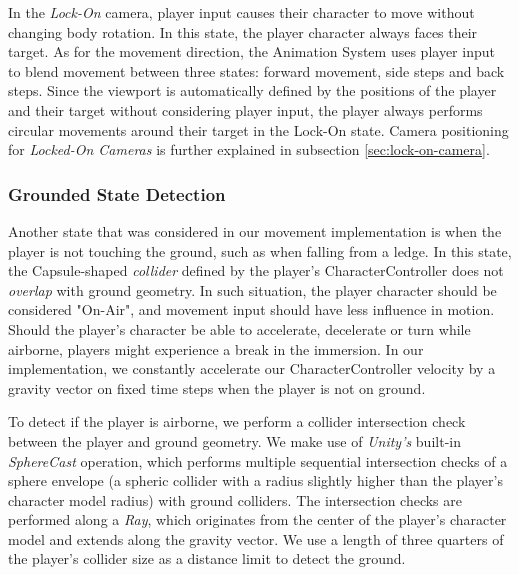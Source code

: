 In the \emph{Lock-On} camera, player input causes their character to move without changing body rotation. In this state, the player character always faces their target. As for the movement direction, the Animation System uses player input to blend movement between three states: forward movement, side steps and back steps. Since the viewport is automatically defined by the positions of the player and their target without considering player input, the player always performs circular movements around their target in the Lock-On state. Camera positioning for \emph{Locked-On Cameras} is further explained in subsection \ref{sec:lock-on-camera}.

\subsubsection{Grounded State Detection}

Another state that was considered in our movement implementation is when the player is not touching the ground, such as when falling from a ledge. In this state, the Capsule-shaped \emph{collider} defined by the player's CharacterController does not \emph{overlap} with ground geometry. In such situation, the player character should be considered "On-Air", and movement input should have less influence in motion. Should the player's character be able to accelerate, decelerate or turn while airborne, players might experience a break in the immersion. In our implementation, we constantly accelerate our CharacterController velocity by a gravity vector on fixed time steps when the player is not on ground.

To detect if the player is airborne, we perform a collider intersection check between the player and ground geometry. We make use of \emph{Unity's} built-in \emph{SphereCast} operation, which  performs multiple sequential intersection checks of a sphere envelope (a spheric collider with a radius slightly higher than the player's character model radius) with ground colliders. The intersection checks are performed along a \emph{Ray}, which originates from the center of the player's character model and extends along the gravity vector. We use a length of three quarters of the player's collider size as a distance limit to detect the ground. 

